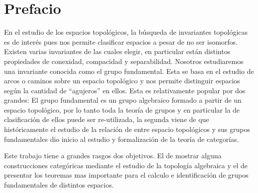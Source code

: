 \section{Prefacio}
En el estudio de los espacios topológicos, la búsqueda de invariantes
topológicas es de interés pues nos permite clasificar espacios a pesar
de no ser isomorfos. Existen varias invariantes de las cuales elegir, en
particular están distintos propiedades de conexidad, compacidad y
separabilidad. Nosotros estudiaremos una invariante conocida
como el grupo fundamental. Esta se basa en el estudio de arcos o caminos
sobre un espacio topológico y nos permite distinguir espacios según la
cantidad de ``agujeros'' en ellos. Esta es relativamente popular por dos
grandes: El grupo fundamental es un grupo algebraico formado a partir de
un espacio topológico, por lo tanto toda la teoría de grupos y en
particular la de clasificación de ellos puede ser re-utilizada, la
segunda viene de que históricamente el estudio de la relación de entre
espacio topológicos y sus grupos fundamentales dio inicio al estudio y
formalización de la teoría de categorías.

Este trabajo tiene a grandes rasgos dos objetivos. El de mostrar alguna
construcciones categóricas mediante el estudio de la topología
algebraica y el de presentar los teoremas mas importante para el calculo
e identificación de grupos fundamentales de distintos espacios.
